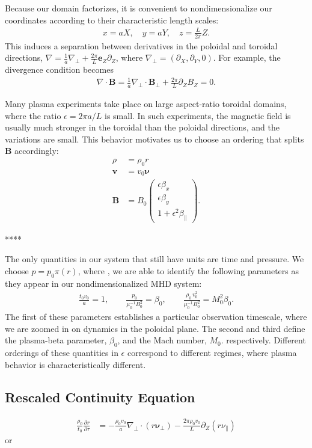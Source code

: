 \documentclass{article}
\newcommand{\para}{\parallel}
\newcommand{\ep}{\epsilon}
\newcommand{\np}{\nabla_\perp}
\newcommand{\p}{\partial}
\newcommand{\deriv}[2]{\frac{\p #1}{\p #2}}
\newcommand{\pth} [1] {\left( #1 \right) }
\newcommand{\pmat} [1] {\begin{pmatrix} #1 \end{pmatrix}}
\begin{document}
Because our domain factorizes, it is convenient to nondimensionalize our coordinates according to their characteristic length scales: 
\begin{align*}
    x=aX,\quad y=aY,\quad z=\frac{L}{2\pi}Z.
\end{align*}
This induces a separation between derivatives in the poloidal and toroidal directions, $\nabla = \frac{1}{a}\np + \frac{2\pi}{L}\bm{e}_Z\p_Z$, where $\np = \pth{\p_X, \p_Y, 0}$. For example, the divergence condition becomes   
\begin{align*}
    \nabla\cdot\bm{B} = \frac{1}{a}\np\cdot\bm{B}_\perp + \frac{2\pi}{L}\p_ZB_Z = 0. 
\end{align*}

Many plasma experiments take place on large aspect-ratio toroidal domains, where the ratio $\ep = 2\pi a/L$ is small. In such experiments, the magnetic field is usually much stronger in the toroidal than the poloidal directions, and the variations are small. This behavior motivates us to choose an ordering that splits $\bm{B}$ accordingly: 
\begin{align*}
    \rho &= \rho_0 r \\
    \bm{v} &= v_0 \bm{\nu} \\ 
    \bm{B} &= B_0 \pmat{\ep\beta_x \\ \ep\beta_y \\ 1+\ep^2\beta_\para}. 
\end{align*}

****

The only quantities in our system that still have units are time and pressure. We choose $p=p_0\pi(r)$, where , we are able to identify the following parameters as they appear in our nondimensionalized MHD system:  
\begin{align*}
    \frac{t_0 v_0}{a} = 1, \qquad 
    \frac{p_0}{\mu_0^{-1}B_0^2} = \beta_0, \qquad 
    \frac{\rho_0\,v_0^2}{\mu_0^{-1}B_0^2} = M_0^2\beta_0. 
\end{align*}
The first of these parameters establishes a particular observation timescale, where we are zoomed in on dynamics in the poloidal plane. The second and third define the plasma-beta parameter, $\beta_0$, and the Mach number, $M_0$. respectively. Different orderings of these quantities in $\ep$ correspond to different regimes, where plasma behavior is characteristically different. 

\subsection{Rescaled Continuity Equation}
\begin{align*}
    \frac{\rho_0}{t_0}\deriv{r}{\tau} &= -\frac{\rho_0v_0}{a}\np\cdot\pth{r\bm{\nu}_\perp} - \frac{2\pi\rho_0v_0}{L} \p_Z\pth{r\nu_\para}
\end{align*}
or 
\end{document}

